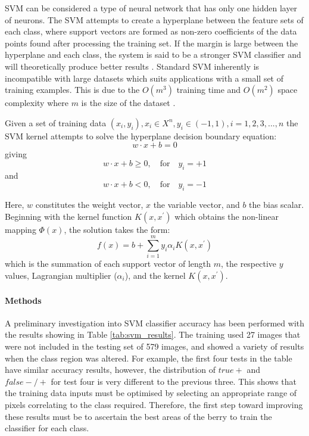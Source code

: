 \documentclass[fleqn,twoside]{article}
\begin{document}
SVM can be considered a type of neural network that has only one hidden layer of neurons. The SVM attempts to create a hyperplane between the feature sets of each class, where support vectors are formed as non-zero coefficients of the data points found after processing the training set. If the margin is large between the hyperplane and each class, the system is said to be a stronger SVM classifier and will theoretically produce better results \cite{osuna}. Standard SVM inherently is incompatible with large datasets which suits applications with a small set of training examples. This is due to the $O(m^3)$ training time and $O(m^2)$ space complexity where $m$ is the size of the dataset \cite{tsang}.

Given a set of training data {$(x_i, y_i), x_i \in X^n, y_i \in (-1,1), i = 1,2,3,...,n$} the SVM kernel attempts to solve the hyperplane decision boundary equation:
\begin{equation}
w \cdot x + b = 0
\end{equation} 
giving
\begin{equation}
w \cdot x + b \geq 0, \quad \textrm{for} \quad y_i = +1
\end{equation}
and
\begin{equation}
w \cdot x + b < 0, \quad \textrm{for} \quad y_i = -1
\end{equation}

Here, $w$ constitutes the weight vector, $x$ the variable vector, and $b$ the bias scalar. Beginning with the kernel function $K(x, x^\prime)$ which obtains the non-linear mapping $\Phi(x)$, the solution takes the form:
\begin{equation}
f(x) = b + \sum_{i=1}^{m} y_i \alpha_i K(x, x^\prime)
\end{equation}
which is the summation of each support vector of length $m$, the respective $y$ values, Lagrangian multiplier ($\alpha_i$), and the kernel $K(x, x^\prime)$.

\paragraph{Methods}

A preliminary investigation into SVM classifier accuracy has been performed with the results showing in Table \ref{tab:svm_results}. The training used 27 images that were not included in the testing set of 579 images, and showed a variety of results when the class region was altered. For example, the first four tests in the table have similar accuracy results, however, the distribution of $true +$ and $false -/+$ for test four is very different to the previous three. This shows that the training data inputs must be optimised by selecting an appropriate range of pixels correlating to the class required. Therefore, the first step toward improving these results must be to ascertain the best areas of the berry to train the classifier for each class. 
\end{document}
